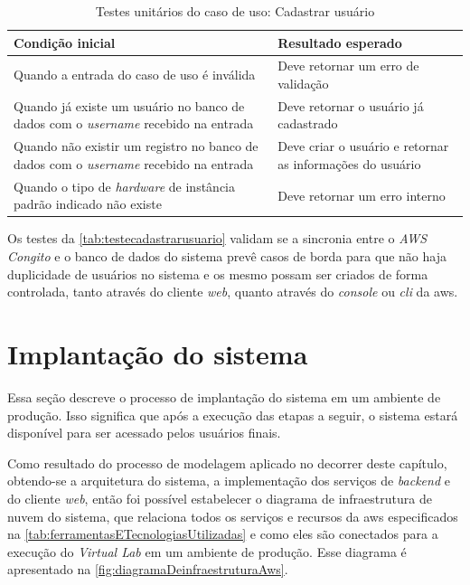 \begin{table}[h]
\caption{Testes unitários do caso de uso: Cadastrar usuário}
\label{tab:testecadastrarusuario}
\begin{tabularx}{\textwidth}{p{} p{}}
\toprule
\textbf{Condição inicial} & \textbf{Resultado esperado} \\ \midrule

Quando a entrada do caso de uso é inválida & Deve retornar um erro de validação \\ \hline

Quando já existe um usuário no banco de dados com o \textit{username} recebido na entrada & Deve retornar o usuário já cadastrado \\ \hline

Quando não existir um registro no banco de dados com o \textit{username} recebido na entrada & Deve criar o usuário e retornar as informações do usuário \\

Quando o tipo de \textit{hardware} de instância padrão indicado não existe & Deve retornar um erro interno \\

\bottomrule
\end{tabularx}
\end{table}

Os testes da \autoref{tab:testecadastrarusuario} validam se a sincronia entre o \textit{AWS Congito} e o banco de dados do sistema prevê casos de borda para que não haja duplicidade de usuários no sistema e os mesmo possam ser criados de forma controlada, tanto através do cliente \textit{web}, quanto através do \textit{console} ou \textit{cli} da \gls{aws}.

\section{Implanta\c{c}\~ao do sistema}
\label{sec:implantacaoDoSistema}

Essa seção descreve o processo de implantação do sistema em um ambiente de produção. Isso significa que após a execução das etapas a seguir, o sistema estará disponível para ser acessado pelos usuários finais.

Como resultado do processo de modelagem aplicado no decorrer deste capítulo, obtendo-se a arquitetura do sistema, a implementação dos serviços de \textit{backend} e do cliente \textit{web}, então foi possível estabelecer o diagrama de infraestrutura de nuvem do sistema, que relaciona todos os serviços e recursos da \gls{aws} especificados na \autoref{tab:ferramentasETecnologiasUtilizadas} e como eles são conectados para a execução do \textit{Virtual Lab} em um ambiente de produção. Esse diagrama é apresentado na \autoref{fig:diagramaDeinfraestruturaAws}.

